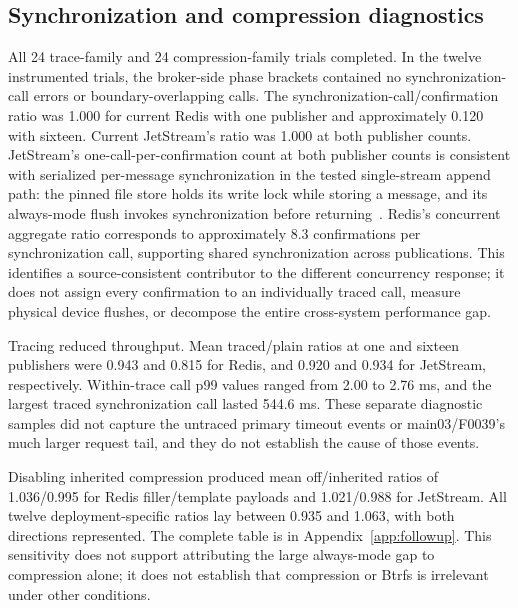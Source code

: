 \subsection{Synchronization and compression diagnostics}\label{sec:followup-diagnostics}

All 24 trace-family and 24 compression-family trials completed. In the twelve instrumented trials, the broker-side phase brackets contained no synchronization-call errors or boundary-overlapping calls. The synchronization-call/confirmation ratio was 1.000 for current Redis with one publisher and approximately 0.120 with sixteen. Current JetStream's ratio was 1.000 at both publisher counts. JetStream's one-call-per-confirmation count at both publisher counts is consistent with serialized per-message synchronization in the tested single-stream append path: the pinned file store holds its write lock while storing a message, and its always-mode flush invokes synchronization before returning~\cite{nats2150filestore}. Redis's concurrent aggregate ratio corresponds to approximately 8.3 confirmations per synchronization call, supporting shared synchronization across publications. This identifies a source-consistent contributor to the different concurrency response; it does not assign every confirmation to an individually traced call, measure physical device flushes, or decompose the entire cross-system performance gap.

Tracing reduced throughput. Mean traced/plain ratios at one and sixteen publishers were 0.943 and 0.815 for Redis, and 0.920 and 0.934 for JetStream, respectively. Within-trace call p99 values ranged from 2.00 to 2.76 ms, and the largest traced synchronization call lasted 544.6 ms. These separate diagnostic samples did not capture the untraced primary timeout events or main03/F0039's much larger request tail, and they do not establish the cause of those events.

Disabling inherited compression produced mean off/inherited ratios of 1.036/0.995 for Redis filler/template payloads and 1.021/0.988 for JetStream. All twelve deployment-specific ratios lay between 0.935 and 1.063, with both directions represented. The complete table is in Appendix~\ref{app:followup}. This sensitivity does not support attributing the large always-mode gap to compression alone; it does not establish that compression or Btrfs is irrelevant under other conditions.

\begin{table}[htbp]
\centering\footnotesize\setlength{\tabcolsep}{3pt}

\caption{Current always-profile synchronization diagnostics. Entries give the mean and range of available deployment estimates; $n_t/n_p$ counts complete traces/paired comparisons, each out of three. Call p99 is a within-trace order statistic. Traced/plain is the paired throughput ratio. Counts combine fsync and fdatasync inside the broker's phase brackets; they are not physical device-flush counts.}
\label{tab:followup-trace}
\end{table}


\FloatBarrier
